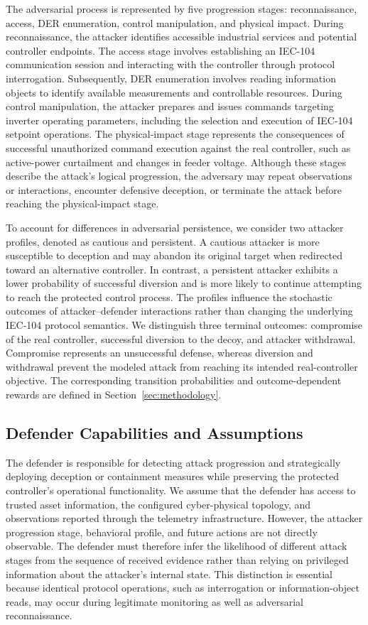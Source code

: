 \documentclass[10pt,conference]{IEEEtran}
\begin{document}
The adversarial process is represented by five progression stages: reconnaissance, access, DER enumeration, control manipulation, and physical impact. During reconnaissance, the attacker identifies accessible industrial services and potential controller endpoints. The access stage involves establishing an IEC-104 communication session and interacting with the controller through protocol interrogation. Subsequently, DER enumeration involves reading information objects to identify available measurements and controllable resources. During control manipulation, the attacker prepares and issues commands targeting inverter operating parameters, including the selection and execution of IEC-104 setpoint operations. The physical-impact stage represents the consequences of successful unauthorized command execution against the real controller, such as active-power curtailment and changes in feeder voltage. Although these stages describe the attack's logical progression, the adversary may repeat observations or interactions, encounter defensive deception, or terminate the attack before reaching the physical-impact stage.

To account for differences in adversarial persistence, we consider two attacker profiles, denoted as cautious and persistent. A cautious attacker is more susceptible to deception and may abandon its original target when redirected toward an alternative controller. In contrast, a persistent attacker exhibits a lower probability of successful diversion and is more likely to continue attempting to reach the protected control process. The profiles influence the stochastic outcomes of attacker--defender interactions rather than changing the underlying IEC-104 protocol semantics. We distinguish three terminal outcomes: compromise of the real controller, successful diversion to the decoy, and attacker withdrawal. Compromise represents an unsuccessful defense, whereas diversion and withdrawal prevent the modeled attack from reaching its intended real-controller objective. The corresponding transition probabilities and outcome-dependent rewards are defined in Section~\ref{sec:methodology}.

\subsection{Defender Capabilities and Assumptions}

The defender is responsible for detecting attack progression and strategically deploying deception or containment measures while preserving the protected controller's operational functionality. We assume that the defender has access to trusted asset information, the configured cyber-physical topology, and observations reported through the telemetry infrastructure. However, the attacker progression stage, behavioral profile, and future actions are not directly observable. The defender must therefore infer the likelihood of different attack stages from the sequence of received evidence rather than relying on privileged information about the attacker's internal state. This distinction is essential because identical protocol operations, such as interrogation or information-object reads, may occur during legitimate monitoring as well as adversarial reconnaissance.
\end{document}
